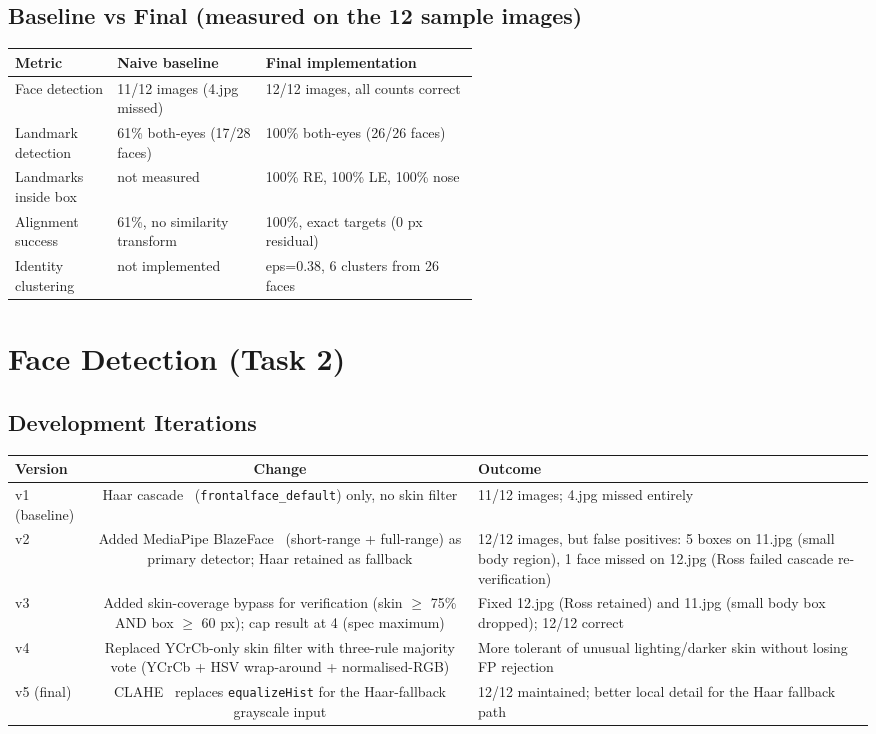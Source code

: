 \documentclass[11pt,a4paper,titlepage]{article}
\begin{document}
\subsection{Baseline vs Final (measured on the 12 sample images)}
\noindent
\begin{tabularx}{\linewidth}{@{}p{0.22\linewidth} p{0.32\linewidth} X@{}}
\toprule
\textbf{Metric} & \textbf{Naive baseline} & \textbf{Final implementation} \\
\midrule
Face detection         & 11/12 images (4.jpg missed)   & 12/12 images, all counts correct \\
Landmark detection     & 61\% both-eyes (17/28 faces)  & 100\% both-eyes (26/26 faces) \\
Landmarks inside box   & not measured                  & 100\% RE, 100\% LE, 100\% nose \\
Alignment success      & 61\%, no similarity transform & 100\%, exact targets (0 px residual) \\
Identity clustering    & not implemented               & eps=0.38, 6 clusters from 26 faces \\
\bottomrule
\end{tabularx}

\section{Face Detection (Task 2)}

\subsection{Development Iterations}
\noindent
\begin{tabularx}{\linewidth}{@{}V C O@{}}
\toprule
\textbf{Version} & \textbf{Change} & \textbf{Outcome} \\
\midrule
v1 (baseline) & Haar cascade~\citep{viola2001rapid} (\texttt{frontalface\_default}) only,
                no skin filter
              & 11/12 images; 4.jpg missed entirely \\
v2 & Added MediaPipe BlazeFace~\citep{bazarevsky2019blazeface} (short-range +
     full-range) as primary detector; Haar retained as fallback
   & 12/12 images, but false positives: 5 boxes on 11.jpg (small body region),
     1 face missed on 12.jpg (Ross failed cascade re-verification) \\
v3 & Added skin-coverage bypass for verification (skin $\geq$ 75\% AND box $\geq$ 60 px);
     cap result at 4 (spec maximum)
   & Fixed 12.jpg (Ross retained) and 11.jpg (small body box dropped); 12/12 correct \\
v4 & Replaced YCrCb-only skin filter with three-rule majority vote
     (YCrCb + HSV wrap-around + normalised-RGB)
   & More tolerant of unusual lighting/darker skin without losing FP rejection \\
v5 (final) & CLAHE~\citep{zuiderveld1994clahe} replaces \texttt{equalizeHist}
             for the Haar-fallback grayscale input
           & 12/12 maintained; better local detail for the Haar fallback path \\
\bottomrule
\end{tabularx}
\end{document}
